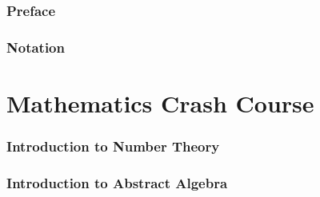 \documentclass{zkdl-template}
\def\maketitle{
    
    \thispagestyle{empty}
    \pagebreak
}
\begin{document}
    \maketitle


    \pagecolor{white}

    \vspace*{\fill}
    
    \begin{abstract}
        \fontsize{10}{12}\selectfont

        \vspace{5mm}

        
    \end{abstract}

    \vspace*{\fill}

    \thispagestyle{empty}
    \newpage


    \pagestyle{fancy}
    \pagecolor{white}

    \tableofcontents

    \pagebreak


    \section{Preface}
    

    \section{Notation}\label{section:notation}
    


    \part{Mathematics Crash Course}
    

    \section{Introduction to Number Theory}\label{section:number-theory}
    

    \section{Introduction to Abstract Algebra}\label{section:abstract-algebra}
    
\end{document}
